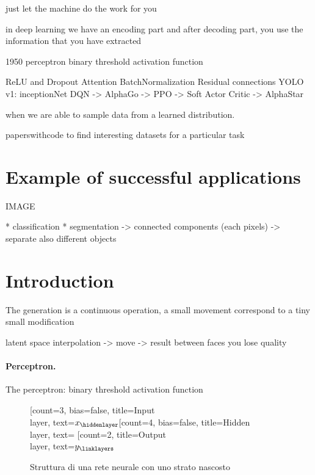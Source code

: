 \documentclass{article}
\begin{document}
just let the machine do the work for you 

in deep learning we have an encoding part 
and after decoding part, you use the information that you have extracted

1950 perceptron binary threshold activation function

ReLU and Dropout
Attention
BatchNormalization
Residual connections
YOLO v1: inceptionNet
DQN -> AlphaGo -> PPO -> Soft Actor Critic -> AlphaStar

when we are able to sample data from a learned distribution. 


paperswithcode to find interesting datasets for a particular task

\section{Example of successful applications}
IMAGE 

* classification 
* segmentation -> connected components (each pixels) -> separate also
different objects

\section{Introduction}

The generation is a continuous operation, a small movement correspond to a
tiny small modification

latent space interpolation -> move -> result 
between faces you lose quality

\paragraph{Perceptron.}

The perceptron: binary threshold activation function

\begin{figure}[!ht]
    \centering
    \begin{neuralnetwork}[height=4]
        \newcommand{\nodetextclear}[2]{}
        \newcommand{\nodetextx}[2]{$x_#2$}
        \newcommand{\nodetexty}[2]{$y_#2$}
        [count=3, bias=false, title=Input\\layer, text=\nodetextx]
        \hiddenlayer[count=4, bias=false, title=Hidden\\layer, text=\nodetextclear] \linklayers
        \outputlayer[count=2, title=Output\\layer, text=\nodetexty] \linklayers
    \end{neuralnetwork}
    \caption{Struttura di una rete neurale con uno strato nascosto} 
    \label{fig:neural_network}
\end{figure}
\end{document}
